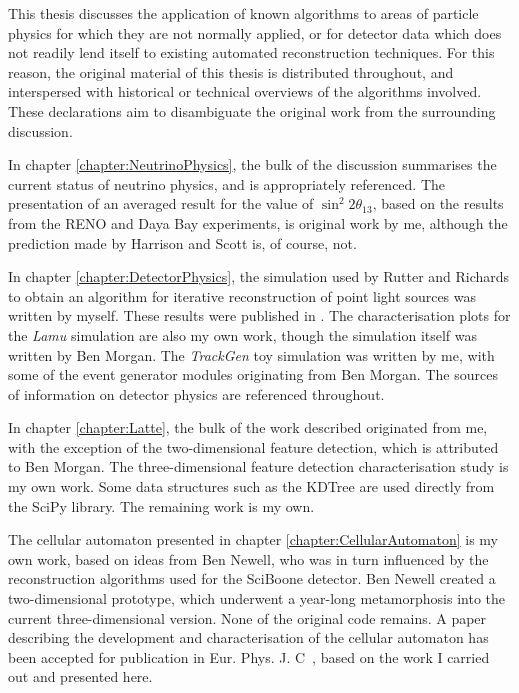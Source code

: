 This thesis discusses the application of known algorithms to areas of particle physics for which they are not normally applied, or for detector data which does not readily lend itself to existing automated reconstruction techniques. For this reason, the original material of this thesis is distributed throughout, and interspersed with historical or technical overviews of the algorithms involved. These declarations aim to disambiguate the original work from the surrounding discussion.

In chapter \ref{chapter:NeutrinoPhysics}, the bulk of the discussion summarises the current status of neutrino physics, and is appropriately referenced. The presentation of an averaged result for the value of $\sin^2 2\theta_{13}$, based on the results from the RENO and Daya Bay experiments, is original work by me, although the prediction made by Harrison and Scott is, of course, not.

In chapter \ref{chapter:DetectorPhysics}, the simulation used by Rutter and Richards to obtain an algorithm for iterative reconstruction of point light sources was written by myself. These results were published in \citep{Rutter2011}. The characterisation plots for the \emph{Lamu} simulation are also my own work, though the simulation itself was written by Ben Morgan. The \emph{TrackGen} toy simulation was written by me, with some of the event generator modules originating from Ben Morgan. The sources of information on detector physics are referenced throughout.

In chapter \ref{chapter:Latte}, the bulk of the work described originated from me, with the exception of the two-dimensional feature detection, which is attributed to Ben Morgan. The three-dimensional feature detection characterisation study is my own work. Some data structures such as the KDTree are used directly from the SciPy library. The remaining work is my own.

The cellular automaton presented in chapter \ref{chapter:CellularAutomaton} is my own work, based on ideas from Ben Newell, who was in turn influenced by the reconstruction algorithms used for the SciBoone detector. Ben Newell created a two-dimensional prototype, which underwent a year-long metamorphosis into the current three-dimensional version. None of the original code remains. A paper describing the development and characterisation of the cellular automaton has been accepted for publication in Eur. Phys. J. C~\citep{Back2013}, based on the work I carried out and presented here.

